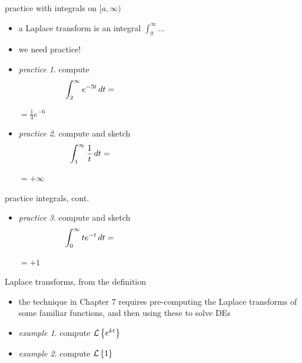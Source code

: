 \documentclass[urlcolor=blue,dvipsnames]{beamer}
\begin{document}
\begin{frame}{practice with integrals on $[a,\infty)$}

\begin{itemize}
\item a Laplace transform is an integral $\int_0^\infty \dots$
\item we need practice!
\item \emph{practice 1}.  compute
    $$\int_2^\infty e^{-3t}\,dt = \hspace{60mm}$$

\vspace{10mm}
\hfill $=\frac{1}{3} e^{-6}$
\item \emph{practice 2}.  compute and sketch
    $$\int_1^\infty \frac{1}{t}\,dt = \hspace{60mm}$$

\vspace{10mm}
\hfill $=+\infty$
\end{itemize}
\end{frame}


\begin{frame}{practice integrals, cont.}

\begin{itemize}
\item \emph{practice 3}.  compute and sketch
    $$\int_0^\infty t e^{-t}\,dt = \hspace{60mm}$$

\vspace{20mm}
\hfill $=+1$

\vspace{10mm}
\end{itemize}
\end{frame}


\begin{frame}{Laplace transforms, from the definition}

\begin{itemize}
\item the technique in Chapter 7 requires pre-computing the Laplace transforms of some familiar functions, and then using these to solve DEs
\item \emph{example 1}.  compute $\mathcal{L}\left\{e^{kt}\right\}$

\vspace{25mm}
\item \emph{example 2}.  compute $\mathcal{L}\left\{1\right\}$

\vspace{25mm}
\end{itemize}
\end{frame}
\end{document}

